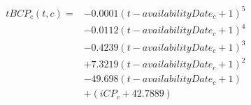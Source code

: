 \begin{equation}
\label{Function timeBoundComponentPrice}
\begin{aligned}
   tBCP_{c}(t, c) = & - 0.0001(t-availabilityDate_{c}+1)^5 \\
   & - 0.0112(t-availabilityDate_{c}+1)^4 \\
   & - 0.4239(t-availabilityDate_{c}+1)^3 \\
   & + 7.3219(t-availabilityDate_{c}+1)^2 \\
   & - 49.698(t-availabilityDate_{c}+1) \\
   & + (iCP_{c} + 42.7889) &&
\end{aligned}   
\end{equation}

